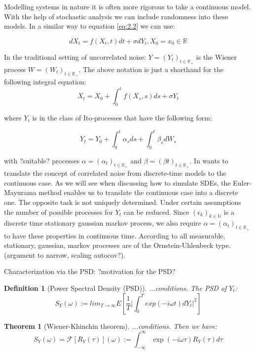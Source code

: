 \documentclass[%
thesis=student,%
coverpage=false,%
titlepage=false,%
headmarks=true, %
german,%
font=libertine, %
math=newpxtx, %
BCOR=5mm,%
coverBCOR=11mm%
]{tumbook}
\newtheorem{definition}{Definition}[section]
\newtheorem{theorem}{Theorem}
\begin{document}
Modelling systems in nature it is often more rigorous to take a continuous model. With the help of stochastic analysis we can include randomness into these models. In a similar way to equation \ref{eq:2.2} we can use: 

\begin{equation}
    dX_{t} = f(X_{t},t)dt + \sigma dY_{t}, X_{0} = x_{0} \in \mathbb{R}
\end{equation}

In the traditional setting of uncorrelated noise: $Y = (Y_{t})_{t \in \mathbb{R}_{+}}$ is the Wiener process $W = (W_{t})_{t\in \mathbb{R}_{+}}$. The above notation is just a shorthand for the following integral equation:
\[
X_{t} = X_{0} + \int_{0}^{t}f(X_{s},s)ds + \sigma Y_{t}
\]

where $Y_{t}$ is in the class of Ito-processes that have the following form:

\[
Y_{t} = Y_{0} + \int_{0}^{t}\alpha_{s}ds + \int_{0}^{t}\beta_{s}dW_{s}
\]

with ?suitable? processes $\alpha = (\alpha_{t})_{t\in\mathbb{R}_{+}}$ and $\beta = (\beta{t})_{t\in\mathbb{R}_{+}}$.
In \cite{Morr:2022} wants to translate the concept of correlated noise from discrete-time models to the continuous case. As we will see when discussing how to simulate SDEs, the Euler-Mayurama method enables us to translate the continuous case into a discrete one. The opposite task is not uniquely determined. Under certain assumptions the number of possible processes for $Y_{t}$ can be reduced. Since $(\epsilon_{k})_{k\in\mathbb{N}}$ is a discrete time stationary gaussian markov process, we also require $\alpha = (\alpha_{t})_{t\in\mathbb{R}_{+}}$ to have these properties in continuous time. According to \cite{doob:1942} all measurable, stationary, gaussian, markov processes are of the Ornstein-Uhlenbeck type. (argument to narrow, scaling autocov?).

Characterization via the PSD:
?motivation for the PSD?

\begin{definition}[Power Spectral Density (PSD)]
...conditions. The PSD of $Y_{t}$:
\[
S_{Y}(\omega) := lim_{T\rightarrow\infty}E[\frac{1}{T}\lvert\int_{0}^{T}exp(-i\omega t)dY_{t}\rvert^{2}]
\]
\end{definition}

\begin{theorem}[Wiener-Khinchin theorem]
...conditions. Then we have:
\[
S_{Y}(\omega) = \mathcal{F}[R_{Y}(\tau)](\omega) := \int_{-\infty}^{\infty}\exp(-i\omega\tau)R_{Y}(\tau)d\tau
\]
\end{theorem}
\end{document}
